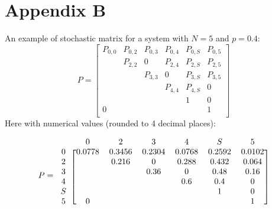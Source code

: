 \section{Appendix B}
\label{app:b}
An example of stochastic matrix for a system with $N = 5$ and $p = 0.4$:
\begin{equation*}
P = 
\begin{bmatrix}
P_{0,0}	& P_{0,2}	& P_{0,3}  	& P_{0, 4}	& P_{0,S}	& P_{0,5} \\
		& P_{2,2}	& 0  		& P_{2, 4}	& P_{2,S}	& P_{2,5} \\
		& 			& P_{3,3}	& 0			& P_{3,S}	& P_{3,5} \\
		& 			& 			& P_{4,4}	& P_{4,S}	& 0\\
		& 			& 			& 			& 1			& 0\\
0		& 			& 		  	& 			& 			& 1\\
\end{bmatrix}
\label{exampleMatrix}
\end{equation*}
Here with numerical values (rounded to 4 decimal places):


\begin{equation*}
P=
\begin{blockarray}{ccccccc}
 & 0 & 2 & 3 & 4 & S & 5 \\
\begin{block}{c[cccccc]}
0	&	0.0778	& 0.3456	& 0.2304  	& 0.0768	& 0.2592	& 0.0102 \\
2	&			& 0.216		& 0  		&0.288		& 0.432		& 0.064 \\
3	&			& 			& 0.36		& 0			& 0.48		& 0.16 \\
4	&			& 			& 			& 0.6		& 0.4		& 0\\
S	&			& 			& 			& 			& 1			& 0\\
5	&	0		& 			& 		  	& 			& 			& 1\\
\end{block}
\end{blockarray}
\label{exampleMatrixValues}
\end{equation*}
\newpage
